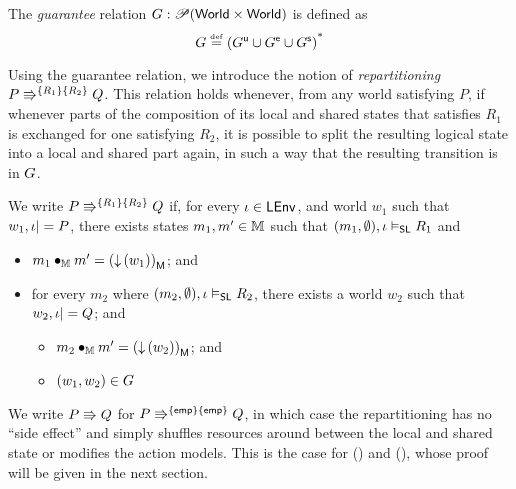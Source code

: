 \begin{definition}[Guarantee]
The \emph{guarantee} relation $\guarantee: \powerset (\Worlds \times \Worlds)$ is defined as
\[
\guarantee \eqdef  \left( \updateG \cup \extendG \cup \shiftG \right)^{\text{*}}
\]
\end{definition}

Using the guarantee relation, we introduce the notion of \emph{repartitioning} $\repartitions{P}{Q}{R_1}{R_2}$. This relation holds whenever, from any world satisfying $P$, if whenever parts of the composition of its local and shared states that satisfies $R_1$ is exchanged for one satisfying $R_2$, it is possible to split the resulting logical state into a local and shared part again, in such a way that the resulting transition is in $\guarantee$.
%
%
\begin{definition}[Repartitioning] \label{def:repartitioning}
We write $\repartitions{P}{Q}{R_1}{R_2}$ if, for every $\lenv \in \LEnv$, and world $w_1$ such that $w_1, \lenv |= P$, there exists states $m_1, m' \in \Heaps$ such that $(m_1, \emptyset), \lenv \slsat R_1$ and
\begin{itemize} 
\item $m_1 \composeH m' = \heapPart{\left(\collapseW{w_1}\right)}$; and
\item for every $m_2$ where $(m_2, \emptyset), \lenv \slsat R_2$,
  there exists a world $w_2$ such that $w_2, \lenv |= Q$; and
  \begin{itemize}
  	\item $m_2 \composeH m' = \heapPart{\left(\collapseW{w_2}\right)}$; and
  	\item $(w_1, w_2) \in \guarantee$
  \end{itemize}
\end{itemize}
\end{definition}

We write $P \semimplies Q$ for $\repartitions{P}{Q}{\emp}{\emp} $, in which case the repartitioning has no ``side effect'' and simply shuffles resources around between the local and shared state or modifies the action models. This is the case for (\shiftRule) and (\extendRule), whose proof will be given in the next section.

